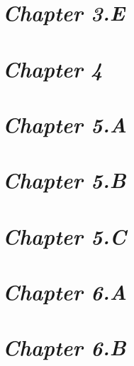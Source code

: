 \documentclass[a4paper,12pt]{article}
\begin{document}
    

    \newpage

    \section{\large \textit{Chapter 3.E}}

    

    \newpage

    \section{\large \textit{Chapter 4}}

    

    \newpage

    \section{\large \textit{Chapter 5.A}}

    

    \newpage

    \section{\large \textit{Chapter 5.B}}

    

    \newpage

    \section{\large \textit{Chapter 5.C}}

    

    \newpage

    \section{\large \textit{Chapter 6.A}}

    

    \newpage

    \section{\large \textit{Chapter 6.B}}

    
\end{document}
